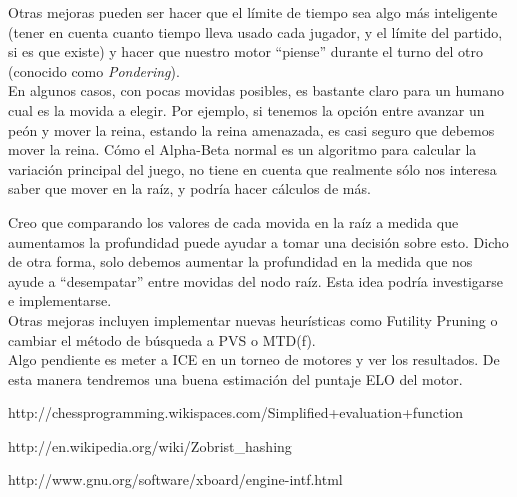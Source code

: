 \documentclass{article}
\begin{document}
Otras mejoras pueden ser hacer que el límite de tiempo sea algo más
inteligente (tener en cuenta cuanto tiempo lleva usado cada jugador,
y el límite del partido, si es que existe) y hacer que nuestro motor
``piense'' durante el turno del otro (conocido como \emph{Pondering}).
\\

En algunos casos, con pocas movidas posibles, es bastante claro para un
humano cual es la movida a elegir. Por ejemplo, si tenemos la opción
entre avanzar un peón y mover la reina, estando la reina amenazada, es
casi seguro que debemos mover la reina. Cómo el Alpha-Beta normal es un
algoritmo para calcular la variación principal del juego, no tiene en
cuenta que realmente sólo nos interesa saber que mover en la raíz, y
podría hacer cálculos de más.

Creo que comparando los valores de cada movida en la raíz a medida que
aumentamos la profundidad puede ayudar a tomar una decisión sobre esto.
Dicho de otra forma, solo debemos aumentar la profundidad en la medida
que nos ayude a ``desempatar'' entre movidas del nodo raíz. Esta idea
podría investigarse e implementarse.
\\

Otras mejoras incluyen implementar nuevas heurísticas como Futility
Pruning o cambiar el método de búsqueda a PVS o MTD(f).
\\

Algo pendiente es meter a ICE en un torneo de motores y ver los
resultados. De esta manera tendremos una buena estimación del puntaje
ELO del motor.

\begin{thebibliography}{9}

  http://chessprogramming.wikispaces.com/Simplified+evaluation+function

  http://en.wikipedia.org/wiki/Zobrist\_hashing

  http://www.gnu.org/software/xboard/engine-intf.html

\end{thebibliography}
\end{document}
